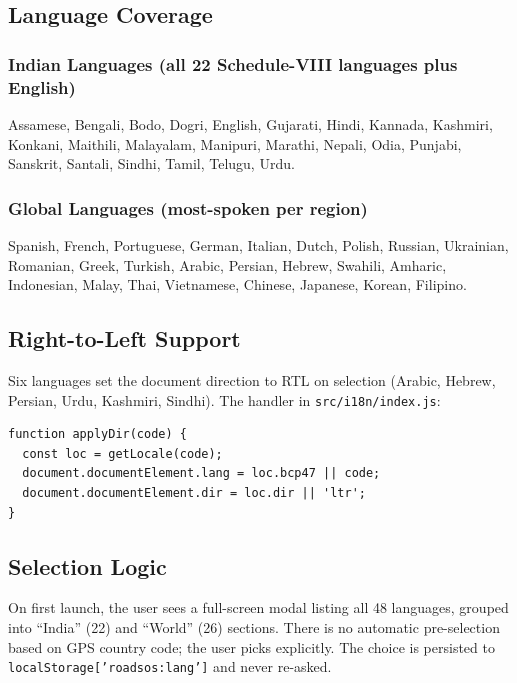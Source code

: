 \documentclass[11pt, a4paper]{article}
\newcommand{\file}[1]{\texttt{\small\color{rsblue}#1}}
\newcommand{\code}[1]{\texttt{\small#1}}
\begin{document}
\subsection{Language Coverage}

\subsubsection{Indian Languages (all 22 Schedule-VIII languages plus English)}

Assamese, Bengali, Bodo, Dogri, English, Gujarati, Hindi, Kannada, Kashmiri, Konkani, Maithili, Malayalam, Manipuri, Marathi, Nepali, Odia, Punjabi, Sanskrit, Santali, Sindhi, Tamil, Telugu, Urdu.

\subsubsection{Global Languages (most-spoken per region)}

Spanish, French, Portuguese, German, Italian, Dutch, Polish, Russian, Ukrainian, Romanian, Greek, Turkish, Arabic, Persian, Hebrew, Swahili, Amharic, Indonesian, Malay, Thai, Vietnamese, Chinese, Japanese, Korean, Filipino.

\subsection{Right-to-Left Support}

Six languages set the document direction to RTL on selection (Arabic, Hebrew, Persian, Urdu, Kashmiri, Sindhi). The handler in \file{src/i18n/index.js}:

\begin{lstlisting}[caption={i18n/index.js --- applyDir}]
function applyDir(code) {
  const loc = getLocale(code);
  document.documentElement.lang = loc.bcp47 || code;
  document.documentElement.dir = loc.dir || 'ltr';
}
\end{lstlisting}

\subsection{Selection Logic}

On first launch, the user sees a full-screen modal listing all 48 languages, grouped into ``India'' (22) and ``World'' (26) sections. There is no automatic pre-selection based on GPS country code; the user picks explicitly. The choice is persisted to \code{localStorage['roadsos:lang']} and never re-asked.
\end{document}
